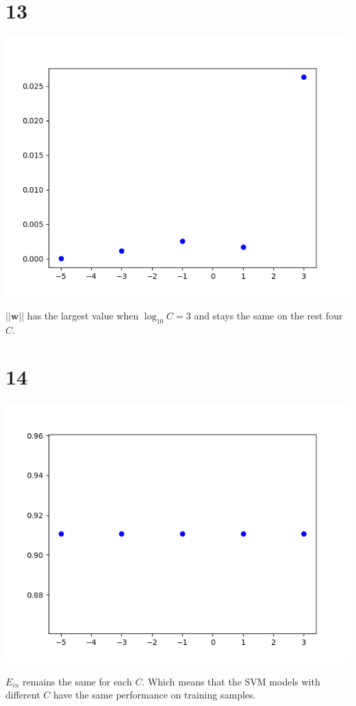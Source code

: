 \documentclass[12pt]{article}
\begin{document}
\section*{13}
\begin{center}
    \includegraphics[scale=0.5]{p13.png}
\end{center}
$||\bm{w}||$ has the largest value when $\log_{10}C = 3$ and stays the same on the rest four $C$.

\section*{14}
\begin{center}
    \includegraphics[scale=0.5]{p14.png}
\end{center}
$E_{in}$ remains the same for each $C$.
Which means that the SVM models with different $C$ have the same performance on training samples.
\end{document}
